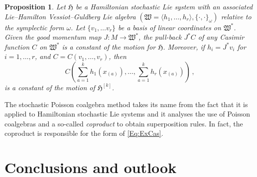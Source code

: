 \documentclass[11pt]{article}
\theoremstyle{plain}
\newtheorem{proposition}[theorem]{Proposition}
\theoremstyle{definition}
\newcommand{\Cinfty}{\mathscr{C}^\infty}
\begin{document}
\begin{proposition}\label{Prop:6.7}
    Let $\mathfrak{H}$ be a Hamiltonian stochastic Lie system with an associated Lie--Hamilton Vessiot--Guldberg Lie algebra $(\mathfrak{W}=\langle h_1,\ldots,h_r\rangle, \{\cdot,\cdot\}_\omega)$ relative to the symplectic form $\omega$. Let $\{v_1,\ldots v_r\}$ be a basis of linear coordinates on $\mathfrak{W}^*$. Given the good momentum map $J : M\to \mathfrak{W}^\ast$, the pull-back $J^\ast C$ of any Casimir function $C$ on $\mathfrak{W}^\ast$ is a constant of the motion for $\mathfrak{H}$. Moreover, if  $h_i=J^*v_i$ for $i=1,\ldots,r$, and $C=C(v_1,\ldots,v_r)$, then 
    \begin{equation}\label{Eq:ExCas}
C\left(\sum_{a=1}^kh_1(x_{(a)}),\ldots, \sum_{a=1}^kh_r(x_{(a)})\right)\,,
\end{equation} is a constant of the motion of $\mathfrak{H}^{[k]}$.
\end{proposition}

The stochastic Poisson coalgebra method takes its name from the fact that it is applied to Hamiltonian stochastic Lie systems and it analyses the use of Poisson coalgebras and a so-called {\it coproduct} to obtain superposition rules. In fact, the coproduct is responsible for the form of \eqref{Eq:ExCas}.



\section{Conclusions and outlook}\label{Eq:Conclusions}
\end{document}
